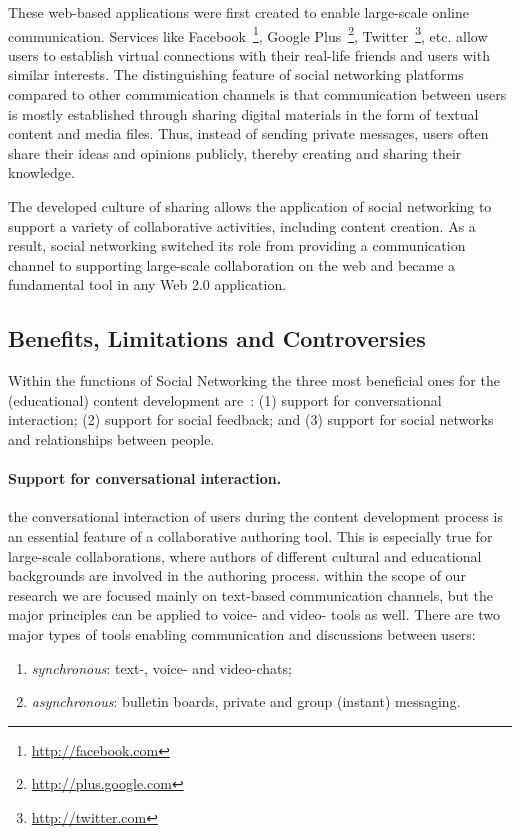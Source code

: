 \documentclass[PhD, Submit, ngerman,UKenglish,table]{scrbook}
\begin{document}
These web-based applications were first created to enable large-scale online communication.
Services like Facebook~\footnote{\url{http://facebook.com}}, Google Plus~\footnote{\url{http://plus.google.com}}, Twitter~\footnote{\url{http://twitter.com}}, etc. allow users to establish virtual connections with their real-life friends and users with similar interests.
The distinguishing feature of social networking platforms compared to other communication channels is that communication between users is mostly established through sharing digital materials in the form of textual content and media files.  
Thus, instead of sending private messages, users often share their ideas and opinions publicly, thereby creating and sharing their knowledge.

The developed culture of sharing allows the application of social networking to support a variety of collaborative activities, including content creation.
As a result, social networking switched its role from providing a communication channel to supporting large-scale collaboration on the web and became a fundamental tool in any Web 2.0 application. 




\subsection{Benefits, Limitations and Controversies}

Within the functions of Social Networking the three most beneficial ones for the (educational) content development are~\cite{boyd2007youth}:
(1) support for conversational interaction; (2) support for social feedback; and 
(3) support for social networks and relationships between people.

\paragraph{Support for conversational interaction.}
the conversational interaction of users during the content development process is an essential feature of a collaborative authoring tool.
This is especially true for large-scale collaborations, where authors of different cultural and educational backgrounds are involved in the authoring process.
within the scope of our research we are focused mainly on text-based communication channels, but the major principles can be applied to voice- and video- tools as well.
There are two major types of tools enabling communication and discussions between users: 
\begin{enumerate}
\item \emph{synchronous}: text-, voice- and video-chats;
\item \emph{asynchronous}: bulletin boards, private and group (instant) messaging.
\end{enumerate}
\end{document}
